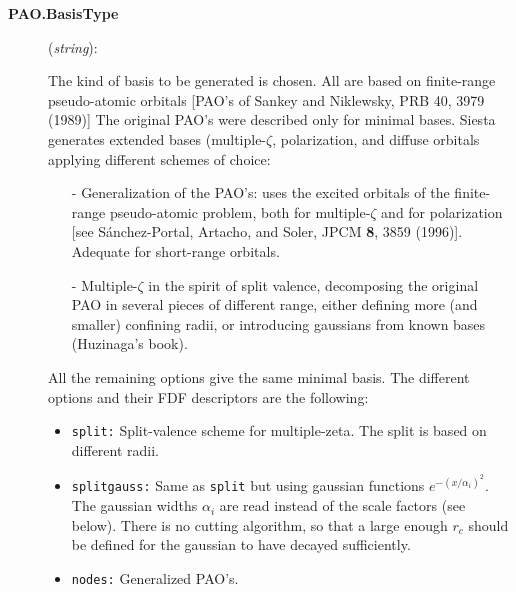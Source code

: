 \documentclass[11pt]{article}
\begin{document}
\begin{description}

\item[{\bf PAO.BasisType}] ({\it string}): 

The kind of basis to be generated is chosen. All are based on
finite-range pseudo-atomic orbitals [PAO's of Sankey and Niklewsky, PRB 40, 3979 (1989)] The
original PAO's were described only for minimal bases. {\sc Siesta}
generates extended bases (multiple-$\zeta$,
polarization, and diffuse
orbitals applying different schemes of choice:

\begin{itemize}

\item[-] Generalization of the PAO's: uses the excited orbitals of the
finite-range pseudo-atomic problem, both for multiple-$\zeta$ and for
polarization [see S\'anchez-Portal, Artacho, and Soler, JPCM {\bf 8},
3859 (1996)]. Adequate for short-range orbitals.

\item[-] Multiple-$\zeta$ in the spirit of split valence, decomposing the original PAO in several pieces of different
range, either defining more (and smaller) confining radii, or
introducing gaussians from known bases (Huzinaga's
book).
\end{itemize}

\noindent
All the remaining options
give the same minimal basis. 
The different options and their FDF descriptors are the following:

\begin{itemize}

\item {\tt split:} Split-valence scheme for multiple-zeta.
The split is based on different radii. 

\item {\tt splitgauss:}
Same as {\tt split} but using gaussian functions
$e^{-(x/\alpha_i)^2}$. The gaussian widths $\alpha_i$ are read instead 
of the scale factors (see below). There is no cutting algorithm, so that
a large enough $r_c$ should be defined for the gaussian to have decayed
sufficiently.

\item {\tt nodes:} Generalized PAO's.


\end{itemize}
\end{description}
\end{document}
